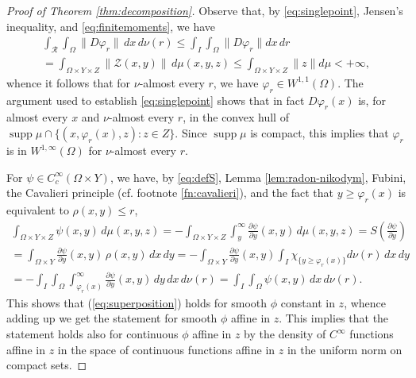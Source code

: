 \documentclass{article}
\theoremstyle{definition}
\theoremstyle{remark}
\begin{document}
\begin{proof}[Proof of Theorem \ref{thm:decomposition}]
Observe that, by \eqref{eq:singlepoint}, Jensen's inequality, and \eqref{eq:finitemoments}, we have
\begin{multline*}
 \int_{{\mathcal R}}\int_\Omega\|D\varphi_r\|\,dx\,d\nu(r)
 {\leq \int_I\int_\Omega \|D\varphi_r\|dx\,dr}\\
 =\int_{\Omega\times Y\times Z}\|\mathcal Z(x,y)\|\,d\mu(x,y,z)
  \leq \int_{\Omega\times Y\times Z}\|z\|d\mu<+\infty,
\end{multline*}
whence it follows that for $\nu$-almost every $r$, we have $\varphi_r\in W^{1,1}(\Omega)$. The argument used to establish \eqref{eq:singlepoint} shows that in fact $D\varphi_r(x)$ is, for almost every $x$ and $\nu$-almost every $r$, in the convex hull of $\operatorname{supp}\mu\cap\{(x,\varphi_r(x),z):z\in Z\}$. Since $\operatorname{supp} \mu$ is compact, this implies that $\varphi_r$ is in $W^{1,\infty}(\Omega)$ for $\nu$-almost every $r$. 

For $\psi\in C_c^\infty(\Omega\times Y)$, we have, by \eqref{eq:defS}, Lemma \ref{lem:radon-nikodym}, Fubini, the Cavalieri principle (cf. footnote \eqref{fn:cavalieri}), and the fact that $y\geq \varphi_r(x)$ is equivalent to $\rho(x,y)\leq r$,
\begin{multline}\label{eq:scalarint}
    \int_{\Omega\times Y\times Z}\psi(x,y)\,d\mu(x,y,z)
    =-\int_{\Omega\times Y\times Z}\int_y^\infty \frac{\partial\psi}{\partial y}(x,y)\,d\mu(x,y,z)
    =S\left(\frac{\partial\psi}{\partial y}\right)\\
    =\int_{\Omega\times Y}\frac{\partial\psi}{\partial y}(x,y)\,\rho(x,y)\,dx\,dy
    =-\int_{\Omega\times Y}\frac{\partial\psi}{\partial y}(x,y)\int_I\chi_{\{y\geq \varphi_r(x)\}}d\nu(r)\,dx\,dy\\
    =-\int_I\int_{\Omega}\int_{\varphi_r(x)}^\infty\frac{\partial\psi}{\partial y}(x,y)\,dy\,dx\,d\nu(r)
    =\int_I\int_{\Omega}\psi(x,y)\,dx\,d\nu(r).
\end{multline}
%
%
%
%
%
%
%
This shows that (\ref{eq:superposition}) holds for smooth $\phi$ constant in $z$, whence adding up we get the statement for smooth $\phi$ affine in $z$. This implies that the statement holds also for continuous $\phi$  affine in $z$ by the density of $C^\infty$ functions affine in $z$ in the space of continuous functions affine in $z$ in the uniform norm on compact sets.
 

\end{proof}
\end{document}
